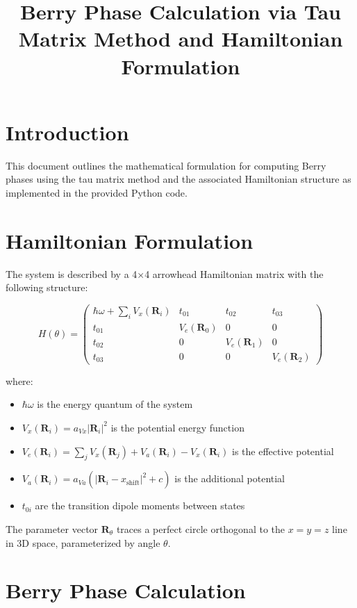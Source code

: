 \documentclass{article}
\title{Berry Phase Calculation via Tau Matrix Method and Hamiltonian Formulation}
\author{}
\date{}
\begin{document}
\maketitle

\section{Introduction}
This document outlines the mathematical formulation for computing Berry phases using the tau matrix method and the associated Hamiltonian structure as implemented in the provided Python code.

\section{Hamiltonian Formulation}

The system is described by a 4×4 arrowhead Hamiltonian matrix with the following structure:

\begin{equation}
H(\theta) = 
\begin{pmatrix}
\hbar\omega + \sum_i V_x(\bm{R}_i) & t_{01} & t_{02} & t_{03} \\
t_{01} & V_e(\bm{R}_0) & 0 & 0 \\
t_{02} & 0 & V_e(\bm{R}_1) & 0 \\
t_{03} & 0 & 0 & V_e(\bm{R}_2)
\end{pmatrix}
\end{equation}

where:
\begin{itemize}
    \item $\hbar\omega$ is the energy quantum of the system
    \item $V_x(\bm{R}_i) = a_{Vx} |\bm{R}_i|^2$ is the potential energy function
    \item $V_e(\bm{R}_i) = \sum_j V_x(\bm{R}_j) + V_a(\bm{R}_i) - V_x(\bm{R}_i)$ is the effective potential
    \item $V_a(\bm{R}_i) = a_{Va} (|\bm{R}_i - x_{\text{shift}}|^2 + c)$ is the additional potential
    \item $t_{0i}$ are the transition dipole moments between states
\end{itemize}

The parameter vector $\bm{R}_\theta$ traces a perfect circle orthogonal to the $x=y=z$ line in 3D space, parameterized by angle $\theta$.

\section{Berry Phase Calculation}
\end{document}
